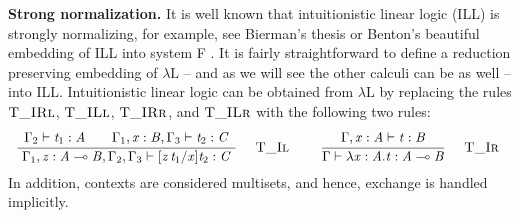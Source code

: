 \documentclass{article}
\begin{document}
\textbf{Strong normalization.}  It is well known that intuitionistic
linear logic (ILL) is strongly normalizing, for example, see Bierman's
thesis \cite{Bierman:1994} or Benton's beautiful embedding of ILL into
system F \cite{Benton:1995c}.  It is fairly straightforward to define
a reduction preserving embedding of $\lambda\text{L}$ -- and as we
will see the other calculi can be as well -- into ILL.  Intuitionistic
linear logic can be obtained from $\lambda\text{L}$ by replacing the
rules $\Ldrulename{T\_IRl}$, $\Ldrulename{T\_ILl}$,
$\Ldrulename{T\_IRr}$, and $\Ldrulename{T\_ILr}$ with the following
two rules:
\[
\begin{array}{cccccccc}
  \LdruleTXXIl{} & \quad \LdruleTXXIr{}
\end{array}
\]
In addition, contexts are considered multisets, and hence, exchange is
handled implicitly.
\end{document}
